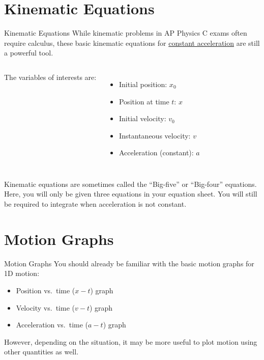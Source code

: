 \documentclass[12pt,compress,aspectratio=169]{beamer}
\begin{document}
\section{Kinematic Equations}

\begin{frame}{Kinematic Equations}
  While kinematic problems in AP Physics C exams often require calculus, these
  basic kinematic equations for \underline{constant acceleration} are still a
  powerful tool.
  \begin{columns}

    \vspace{-.3in}{\Large
      \begin{align*}
        x &= x_0+ v_0t + \frac12at^2\\
        v &= v_0+at\\
        v^2 &= v_0^2+ 2a(x-x_0)
      \end{align*}
    }
    
    The variables of interests are:
    \begin{itemize}
    \item Initial position: $x_0$
    \item Position at time $t$: $x$
    \item Initial velocity: $v_0$
    \item Instantaneous velocity: $v$
    \item Acceleration (constant): $a$
    \end{itemize}
  \end{columns}
  Kinematic equations are sometimes called the ``Big-five'' or ``Big-four''
  equations. Here, you will only be given three equations in your equation
  sheet. You will still be required to integrate when acceleration is not
  constant.
\end{frame}



\section{Motion Graphs}

\begin{frame}{Motion Graphs}
  You should already be familiar with the basic motion graphs for 1D motion:
  \begin{itemize}
  \item Position vs.\ time ($x-t$) graph
  \item Velocity vs.\ time ($v-t$) graph
  \item Acceleration vs.\ time ($a-t$) graph
  \end{itemize}

  However, depending on the situation, it may be more useful to plot motion
  using other quantities as well.
\end{frame}
\end{document}
